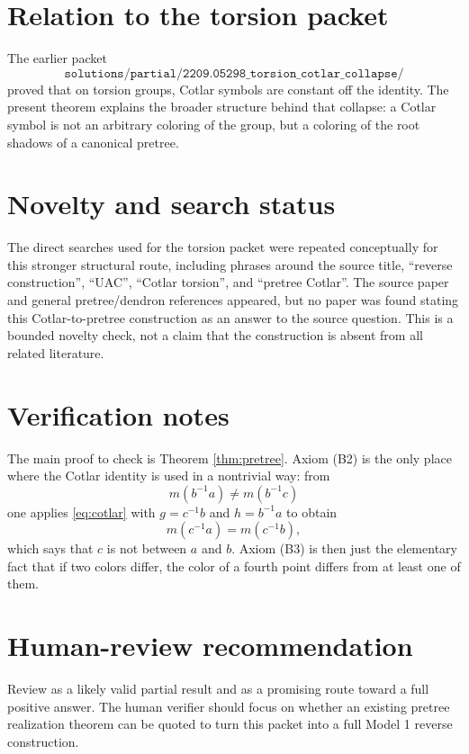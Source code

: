 \documentclass[11pt]{article}
\begin{document}
\section*{Relation to the torsion packet}

The earlier packet
\[
\texttt{solutions/partial/2209.05298\_torsion\_cotlar\_collapse/}
\]
proved that on torsion groups, Cotlar symbols are constant off the identity.
The present theorem explains the broader structure behind that collapse: a
Cotlar symbol is not an arbitrary coloring of the group, but a coloring of the
root shadows of a canonical pretree.

\section*{Novelty and search status}

The direct searches used for the torsion packet were repeated conceptually for
this stronger structural route, including phrases around the source title,
``reverse construction'', ``UAC'', ``Cotlar torsion'', and ``pretree Cotlar''.
The source paper and general pretree/dendron references appeared, but no
paper was found stating this Cotlar-to-pretree construction as an answer to
the source question. This is a bounded novelty check, not a claim that the
construction is absent from all related literature.

\section*{Verification notes}

The main proof to check is Theorem \ref{thm:pretree}. Axiom (B2) is the only
place where the Cotlar identity is used in a nontrivial way: from
\[
  m(b^{-1}a)\ne m(b^{-1}c)
\]
one applies \eqref{eq:cotlar} with \(g=c^{-1}b\) and \(h=b^{-1}a\) to obtain
\[
  m(c^{-1}a)=m(c^{-1}b),
\]
which says that \(c\) is not between \(a\) and \(b\). Axiom (B3) is then just
the elementary fact that if two colors differ, the color of a fourth point
differs from at least one of them.

\section*{Human-review recommendation}

Review as a likely valid partial result and as a promising route toward a
full positive answer. The human verifier should focus on whether an existing
pretree realization theorem can be quoted to turn this packet into a full
Model 1 reverse construction.
\end{document}
